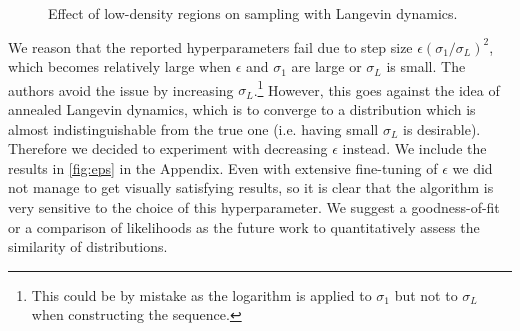 \begin{figure}[h!]
     \caption{Effect of low-density regions on sampling with Langevin dynamics.}
     \label{fig:toy3}
\end{figure}

We reason that the reported hyperparameters fail due to step size $\epsilon(\sigma_1 / \sigma_L)^2$, which becomes relatively large when $\epsilon$ and $\sigma_1$ are large or $\sigma_L$ is small. The authors avoid the issue by increasing $\sigma_L$.\footnote{This could be by mistake as the logarithm is applied to $\sigma_1$ but not to $\sigma_L$ when constructing the sequence.} However, this goes against the idea of annealed Langevin dynamics, which is to converge to a distribution which is almost indistinguishable from the true one (i.e. having small $\sigma_L$ is desirable). Therefore we decided to experiment with decreasing $\epsilon$ instead. We include the results in \autoref{fig:eps} in the Appendix. Even with extensive fine-tuning of $\epsilon$ we did not manage to get visually satisfying results, so it is clear that the algorithm is very sensitive to the choice of this hyperparameter. We suggest a goodness-of-fit or a comparison of likelihoods as the future work to quantitatively assess the similarity of distributions.